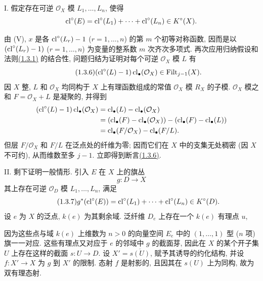 I. 假定存在可逆 $\mathcal O_X$ 模 $L_1,\ldots,L_n$, 使得
%
\[
\operatorname{cl}^\circ(E)=\operatorname{cl}^\circ(L_1)+\cdots+\operatorname{cl}^\circ(L_n)\in K^\circ(X).
\]

由 (V), $x$ 是各 $\operatorname{cl}^\circ(L_r)-1$ ($r=1,\ldots,n$) 的第 $m$ 个初等对称函数, 因而是以 $(\operatorname{cl}^\circ(L_r)-1)$ ($r=1,\ldots,n$) 为变量的整系数 $m$ 次齐次多项式. 再次应用归纳假设和法则\hyperlink{sga6.e10.eq.1-3-1}{(1.3.1)} 的结合性, 问题归结为证明对每个可逆 $\mathcal O_X$ 模 $L$ 有
%
%
%
%
%
\begin{equation}\tag{1.3.6}
(\operatorname{cl}^\circ(L)-1)\operatorname{cl}_\bullet(\mathcal O_X)\in\operatorname{Filt}_{j-1}(X).
\end{equation}
因 $X$ 整, $L$ 和 $\mathcal O_X$ 均同构于 $X$ 上有理函数组成的常值 $\mathcal O_X$ 模 $R_X$ 的子模. $\mathcal O_X$ 模之和 $F=\mathcal O_X+L$ 是凝聚的, 并得到
%
%
\begin{align*}
(\operatorname{cl}^\circ(L)-1)\operatorname{cl}_\bullet(\mathcal O_X)
&=\operatorname{cl}_\bullet(L)-\operatorname{cl}_\bullet(\mathcal O_X)\\
&=(\operatorname{cl}_\bullet(F)-\operatorname{cl}_\bullet(\mathcal O_X))
  -(\operatorname{cl}_\bullet(F)-\operatorname{cl}_\bullet(L))\\
&=\operatorname{cl}_\bullet(F/\mathcal O_X)-\operatorname{cl}_\bullet(F/L).
\end{align*}
但层 $F/\mathcal O_X$ 和 $F/L$ 在泛点处的纤维为零; 因而它们在 $X$ 中的支集无处稠密 (因 $X$ 不可约), 从而维数至多 $j-1$. 立即得到断言\hyperlink{sga6.e10.eq.1-3-6}{(1.3.6)}.
%
%
%

II. 剩下证明一般情形. 引入 $E$ 在 $X$ 上的旗丛
\[
g:D\longrightarrow X
\]
其上存在可逆 $\mathcal O_D$ 模 $L_1,\ldots,L_n$, 满足
%
\begin{equation}\tag{1.3.7}
g^*(\operatorname{cl}^\circ(E))=\operatorname{cl}^\circ(L_1)+\cdots+\operatorname{cl}^\circ(L_n)\in K^\circ(D).
\end{equation}
设 $e$ 为 $X$ 的泛点, $k(e)$ 为其剩余域. 泛纤维 $D_e$ 上存在一个 $k(e)$ 有理点 $u$,
%

因为这些点与域 $k(e)$ 上维数为 $n>0$ 的向量空间 $E_e$ 中的 $(1,\ldots,1)$ 型 ($n$ 项) 旗一一对应. 这些有理点又对应于 $e$ 的邻域中 $g$ 的截面芽, 因此在 $X$ 的某个开子集 $U$ 上存在这样的截面 $s:U\to D$. 设 $X'=\overline{s(U)}$, 赋予其诱导的约化结构, 并设 $f:X'\to X$ 为 $g$ 到 $X'$ 的限制. 态射 $f$ 是射影的, 且因其在 $s(U)$ 上为同构, 故为双有理态射.
%
%
%
%
%
%
%

